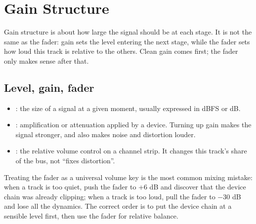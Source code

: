 \chapter{Gain Structure}
\label{chap:gain-structure}


Gain structure is about how large the signal should be at each stage. It is not
the same as the fader: gain sets the level entering the next stage, while the
fader sets how loud this track is relative to the others. Clean gain comes first;
the fader only makes sense after that.

\section{Level, gain, fader}

\begin{itemize}
  \item {}: the size of a signal at a given moment, usually expressed in
        dBFS or dB.
  \item {}: amplification or attenuation applied by a device. Turning up
        gain makes the signal stronger, and also makes noise and distortion louder.
  \item {}: the relative volume control on a channel strip. It changes
        this track's share of the bus, not ``fixes distortion''.
\end{itemize}

Treating the fader as a universal volume key is the most common mixing mistake:
when a track is too quiet, push the fader to +6 dB and discover that the device
chain was already clipping; when a track is too loud, pull the fader to −30 dB
and lose all the dynamics. The correct order is to put the device chain at a
sensible level first, then use the fader for relative balance.

\begin{center}
\end{center}


